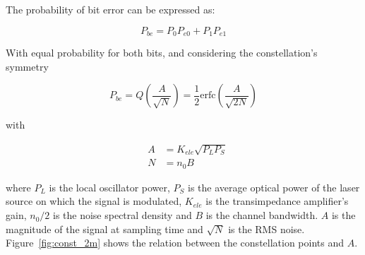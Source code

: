 \begin{refsection}
The probability of bit error can be expressed as:

\begin{equation}
P_{be} = P_0 P_{e0} + P_1 P_{e1}
\end{equation}

With equal probability for both bits, and considering the constellation's symmetry

\begin{equation}\label{eq:berMQAM}
P_{be} =  Q\left({\frac{A}{\sqrt{N}}}\right) = \frac{1}{2} \text{erfc}\left({\frac{A}{\sqrt{2 N}}}\right)
\end{equation}





with


\begin{eqnarray}
&A &= K_{ele} \sqrt{P_L P_S}\label{eq:bpskamplitude}\\
&N & = n_0 B\label{eq:noiseBw}
\end{eqnarray}

\noindent where $P_L$ is the local oscillator power, $P_S$ is the average
optical power of the laser source on which the signal is modulated, $K_{ele}$ is
the transimpedance amplifier's gain, $n_0/2$ is the noise spectral density and
$B$ is the channel bandwidth. $A$ is the magnitude of the signal at sampling
time and $\sqrt{N}$ is the RMS noise. Figure~\ref{fig:const_2m} shows the
relation between the constellation points and $A$.


\end{refsection}
